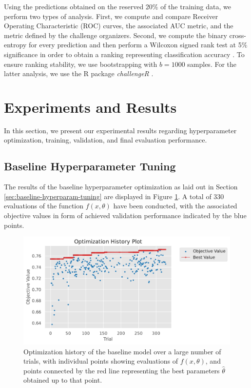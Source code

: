 \documentclass[runningheads]{llncs}
\begin{document}
Using the predictions obtained on the reserved 20\% of the training data, we perform two types of analysis. First, we compute and compare Receiver Operating Characteristic (ROC) curves, the associated AUC metric, and the metric defined by the challenge organizers. Second, we compute the binary cross-entropy for every prediction and then perform a Wilcoxon signed rank test at 5\% significance in order to obtain a ranking representing classification accuracy \cite{conover1999practical}. To ensure ranking stability, we use bootstrapping with $b=1000$ samples. For the latter analysis, we use the R package \emph{challengeR} \cite{wiesenfarth2021methods}.








\section{Experiments and Results}
\label{sec:experiments}

In this section, we present our experimental results regarding hyperparameter optimization, training, validation, and final evaluation performance.

\subsection{Baseline Hyperparameter Tuning}

The results of the baseline hyperparameter optimization as laid out in Section \ref{sec:baseline-hyperparam-tuning} are displayed in Figure \ref{fig:hyperparam-optimization-history}. A total of 330 evaluations of the function $f(x, \theta)$ have been conducted, with the associated objective values in form of achieved validation performance indicated by the blue points.

\begin{figure}
    \centering
    \includegraphics[width=\textwidth]{220915_optimization_history_plot.pdf}
    \caption{Optimization history of the baseline model over a large number of trials, with individual points showing evaluations of $f(x, \theta)$, and points connected by the red line representing the best parameters $\hat{\theta}$ obtained up to that point.}
    \label{fig:hyperparam-optimization-history}
\end{figure}
\end{document}
